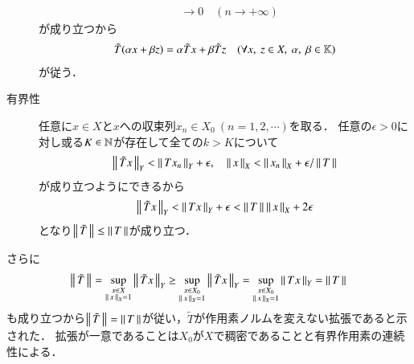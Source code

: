 \begin{prf}
\begin{description}
\begin{align}
					&\longrightarrow 0\quad (n \longrightarrow +\infty)
				\end{align}
				が成り立つから
				\begin{align}
					\tilde{T}(\alpha x + \beta z) = \alpha \tilde{T}x + \beta \tilde{T}z \quad (\forall x,\ z \in X,\ \alpha,\ \beta \in \mathbb{K})
				\end{align}
				が従う．
			\item[有界性] 任意に$x \in X$と$x$への収束列$x_n \in X_0\ (n = 1,2,\cdots)$を取る．
				任意の$\epsilon > 0$に対し或る$K \in \mathbb{N}$が存在して全ての$k > K$について
				\begin{align}
					\left\|\, \tilde{T}x\, \right\|_{Y} < \left\|\, Tx_n\, \right\|_{Y} + \epsilon, \quad \left\|\, x\, \right\|_{X} < \left\|\, x_n\, \right\|_{X} + \epsilon/\left\|\, T\, \right\|_{}
				\end{align}
				が成り立つようにできるから
				\begin{align}
					\left\|\, \tilde{T}x\, \right\|_{Y} < \left\|\, Tx\, \right\|_{Y} + \epsilon < \left\|\, T\, \right\|_{} \left\|\, x\, \right\|_{X} + 2\epsilon
				\end{align}
				となり$\left\|\, \tilde{T}\, \right\|_{} \leq \left\|\, T\, \right\|_{}$が成り立つ．
		\end{description}
		さらに
		\begin{align}
			\left\|\, \tilde{T}\, \right\|_{} = \operatorname*{sup}_{\substack{x \in X \\ \left\|\, x\, \right\|_{X} = 1}} \left\|\, \tilde{T}x\, \right\|_{Y} 
			\geq \operatorname*{sup}_{\substack{x \in X_0 \\ \left\|\, x\, \right\|_{X} = 1}} \left\|\, \tilde{T}x\, \right\|_{Y} 
			= \operatorname*{sup}_{\substack{x \in X_0 \\ \left\|\, x\, \right\|_{X} = 1}} \left\|\, Tx\, \right\|_{Y} = \left\|\, T\, \right\|_{}
		\end{align}
		も成り立つから$\left\|\, \tilde{T}\, \right\|_{} = \left\|\, T\, \right\|_{}$が従い，$\tilde{T}$が作用素ノルムを変えない拡張であると示された．
		拡張が一意であることは$X_0$が$X$で稠密であることと有界作用素の連続性による．
		\QED
\end{prf}

